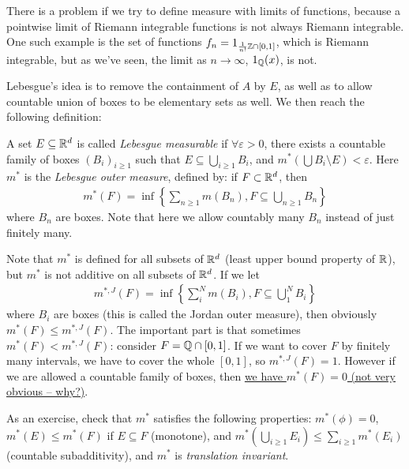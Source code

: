 \documentclass[a4paper]{article}
\begin{document}
There is a problem if we try to define measure with limits of functions, because a pointwise limit of Riemann integrable functions is not always Riemann integrable. One such example is the set of functions $f_n = 1_{\frac{1}{n!}\mathbb{Z} \cap [0,1]}$, which is Riemann integrable, but as we've seen, the limit as $n \to \infty$, $1_{\mathbb{Q}}(x)$, is not.

Lebesgue's idea is to remove the containment of $A$ by $E$, as well as to allow countable union of boxes to be elementary sets as well. We then reach the following definition:

\begin{defi}
A set $E \subseteq \mathbb{R}^d$ is called \emph{Lebesgue measurable} if $\forall \varepsilon>0$, there exists a countable family of boxes $(B_i)_{i \geq 1}$ such that $E \subseteq \bigcup_{i\geq 1} B_i$, and $m^*(\bigcup B_i \setminus E)<\varepsilon$. Here $m^*$ is the \emph{Lebesgue outer measure}, defined by: if $F \subset \mathbb{R}^d$, then
\begin{equation*}
\begin{aligned}
m^*(F) = \inf\left\{\sum_{n \geq 1} m(B_n),F\subseteq \bigcup_{n\geq 1} B_n\right\}
\end{aligned}
\end{equation*}
where $B_n$ are boxes. Note that here we allow countably many $B_n$ instead of just finitely many.
\end{defi}

Note that $m^*$ is defined for all subsets of $\mathbb{R}^d$ (least upper bound property of $\mathbb{R}$), but $m^*$ is not additive on all subsets of $\mathbb{R}^d$. If we let
\begin{equation*}
\begin{aligned}
m^{*,J} (F) = \inf \left\{ \sum_i^N m(B_i), F \subseteq \bigcup_1^N B_i \right\}
\end{aligned}
\end{equation*}
where $B_i$ are boxes (this is called the Jordan outer measure), then obviously $m^*(F) \leq m^{*,J}(F)$. The important part is that sometimes $m^*(F) < m^{*,J}(F)$: consider $F=\mathbb{Q} \cap [0,1]$. If we want to cover $F$ by finitely many intervals, we have to cover the whole $[0,1]$, so $m^{*,J}(F)=1$. However if we are allowed a countable family of boxes, then \underline{we have $m^*(F)=0$ (not very obvious -- why?)}.

As an exercise, check that $m^*$ satisfies the following properties: $m^*(\phi)=0$, $m^*(E) \leq m^*(F)$ if $E \subseteq F$ (monotone), and $m^*(\bigcup_{i\geq 1} E_i) \leq \sum_{i \geq 1} m^* (E_i)$ (countable subadditivity), and $m^*$ is \emph{translation invariant}.
\end{document}
